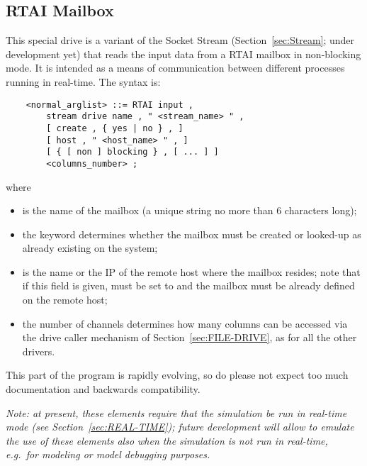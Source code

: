 \subsection{RTAI Mailbox}\label{sec:RTAI_in}
This special drive is a variant of the Socket Stream
(Section~\ref{sec:Stream}; under development yet)
that reads the input data from a RTAI mailbox in non-blocking mode.
It is intended as a means of communication between different processes
running in real-time.
The syntax is:
\begin{verbatim}
    <normal_arglist> ::= RTAI input ,
        stream drive name , " <stream_name> " ,
        [ create , { yes | no } , ]
        [ host , " <host_name> " , ]
        [ { [ non ] blocking } , [ ... ] ]
        <columns_number> ;
\end{verbatim}
where
\begin{itemize}
\item {} is the name of the mailbox (a unique string 
no more than 6 characters long);
\item the  keyword determines whether the mailbox 
must be created or looked-up as already existing on the system;
\item {} is the name or the IP of the remote host where 
the mailbox resides; note that if this field is given,  must
be set to  and the mailbox must be already defined
on the remote host;
\item the number of channels  determines how many
columns can be accessed via the  drive caller mechanism 
of Section~\ref{sec:FILE-DRIVE}, as for all the other  drivers.
\end{itemize}
This part of the program is rapidly evolving, so do please not expect
too much documentation and backwards compatibility.

\emph{Note: at present, these elements require that the simulation
be run in real-time mode (see Section~\ref{sec:REAL-TIME});
future development will allow to emulate the use of these elements
also when the simulation is not run in real-time, e.g.\ for modeling
or model debugging purposes.}



